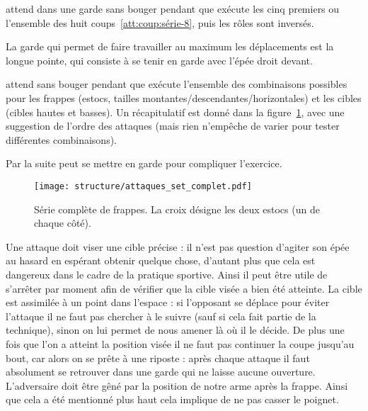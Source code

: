 \begin{exercice}
	\label{att:ex:série-garde}


	\D attend dans une garde sans bouger pendant que \A exécute les cinq premiers ou l'ensemble des huit coups~\ref{att:coup:série-8}, puis les rôles sont inversés.

	La garde qui permet de faire travailler au maximum les déplacements est la longue pointe, qui consiste à se tenir en garde avec l'épée droit devant.
\end{exercice}


\begin{exercice}


	\D attend sans bouger pendant que \A exécute l'ensemble des combinaisons possibles pour les frappes (estocs, tailles montantes/descendantes/horizontales) et les cibles (cibles hautes et basses).
	Un récapitulatif est donné dans la figure~\ref{att:fig:série-complète}, avec une suggestion de l'ordre des attaques (mais rien n'empêche de varier pour tester différentes combinaisons).

	Par la suite \D peut se mettre en garde pour compliquer l'exercice.
\end{exercice}


\begin{figure}[ht]
	\centering
	\texttt{[image: structure/attaques\_set\_complet.pdf]}
	\caption{Série complète de frappes.
	La croix désigne les deux estocs (un de chaque côté).}
	\label{att:fig:série-complète}
\end{figure}


Une attaque doit viser une cible précise : il n'est pas question d'agiter son épée au hasard en espérant obtenir quelque chose, d'autant plus que cela est dangereux dans le cadre de la pratique sportive.
Ainsi il peut être utile de s'arrêter par moment afin de vérifier que la cible visée a bien été atteinte.
La cible est assimilée à un point dans l'espace : si l'opposant se déplace pour éviter l'attaque il ne faut pas chercher à le suivre (sauf si cela fait partie de la technique), sinon on lui permet de nous amener là où il le décide.
De plus une fois que l'on a atteint la position visée il ne faut pas continuer la coupe jusqu'au bout, car alors on se prête à une riposte : après chaque attaque il faut absolument se retrouver dans une garde qui ne laisse aucune ouverture.
L'adversaire doit être gêné par la position de notre arme après la frappe.
Ainsi que cela a été mentionné plus haut cela implique de ne pas casser le poignet.

